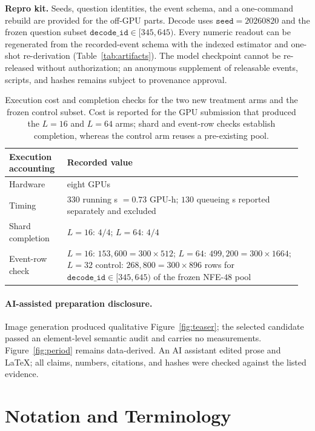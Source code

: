 \documentclass{article}
\begin{document}
\textbf{Repro kit.} Seeds, question identities, the event schema, and a
one-command rebuild are provided for the off-GPU parts. Decode uses
$\texttt{seed}{=}20260820$ and the frozen question subset
$\texttt{decode\_id}\in[345,645)$. Every numeric readout can be regenerated from
the recorded-event schema with the indexed estimator and one-shot re-derivation
(Table~\ref{tab:artifacts}). The model checkpoint cannot be re-released without
authorization; an anonymous supplement of releasable events, scripts, and hashes
remains subject to provenance approval.

\begin{table}[H]
\centering
\footnotesize
\setlength{\tabcolsep}{2pt}
\begin{tabular}{@{}>{\raggedright\arraybackslash}p{0.19\linewidth}
                    >{\raggedright\arraybackslash}p{0.77\linewidth}@{}}
\toprule
Execution accounting & Recorded value \\
\midrule
Hardware & eight GPUs \\
Timing & $330$ running s $=0.73$ GPU-h; $130$ queueing s reported separately
and excluded \\
Shard completion & $L=16$: $4/4$; $L=64$: $4/4$ \\
Event-row check & $L=16$: $153{,}600=300\times512$;
$L=64$: $499{,}200=300\times1664$; $L=32$ control:
$268{,}800=300\times896$ rows for $\texttt{decode\_id}\in[345,645)$ of the
frozen NFE-$48$ pool \\
\bottomrule
\end{tabular}
\caption{Execution cost and completion checks for the two new treatment arms and
the frozen control subset. Cost is reported for the GPU submission that produced
the $L{=}16$ and $L{=}64$ arms; shard and event-row checks establish completion,
whereas the control arm reuses a pre-existing pool.}
\label{tab:exec}
\end{table}

\paragraph{AI-assisted preparation disclosure.}
Image generation produced qualitative Figure~\ref{fig:teaser}; the selected
candidate passed an element-level semantic audit and carries no measurements.
Figure~\ref{fig:period} remains data-derived. An AI assistant edited prose and
LaTeX; all claims, numbers, citations, and hashes were checked against the listed
evidence.

\section{Notation and Terminology}\label{app:glossary}
\end{document}
